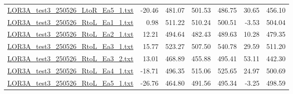\documentclass[platex,dvipdfmx,10pt,twoside,a4paper,jis2004]{jsarticle}
\begin{document}
\begin{table}[H]
{\begin{tabular}{lD{.}{.}{4.2}D{.}{.}{4.2}D{.}{.}{4.2}D{.}{.}{4.2}D{.}{.}{4.2}D{.}{.}{4.2}}
            \hyperref[fig:LOR3Atest3250526LtoREa51]{LOR3A\_test3\_250526\_LtoR\_Ea5\_1.txt} & -20.46 & 481.07 & 501.53 & 486.75 & 30.65 & 456.10 \\
            \hyperref[fig:LOR3Atest3250526RtoLEa11]{LOR3A\_test3\_250526\_RtoL\_Ea1\_1.txt} & 0.98 & 511.22 & 510.24 & 500.51 & -3.53 & 504.04 \\
            \hyperref[fig:LOR3Atest3250526RtoLEa21]{LOR3A\_test3\_250526\_RtoL\_Ea2\_1.txt} & 12.21 & 494.64 & 482.43 & 489.63 & 10.28 & 479.35 \\
            \hyperref[fig:LOR3Atest3250526RtoLEa31]{LOR3A\_test3\_250526\_RtoL\_Ea3\_1.txt} & 15.77 & 523.27 & 507.50 & 540.78 & 29.59 & 511.20 \\
            \hyperref[fig:LOR3Atest3250526RtoLEa32]{LOR3A\_test3\_250526\_RtoL\_Ea3\_2.txt} & 13.01 & 468.89 & 455.88 & 495.41 & 53.11 & 442.30 \\
            \hyperref[fig:LOR3Atest3250526RtoLEa41]{LOR3A\_test3\_250526\_RtoL\_Ea4\_1.txt} & -18.71 & 496.35 & 515.06 & 525.65 & 24.97 & 500.69 \\
            \hyperref[fig:LOR3Atest3250526RtoLEa51]{LOR3A\_test3\_250526\_RtoL\_Ea5\_1.txt} & -26.76 & 464.80 & 491.56 & 495.34 & -3.25 & 498.59 \\
            \bottomrule
        \end{tabular}
    }
\end{table}
\clearpage
\end{document}
